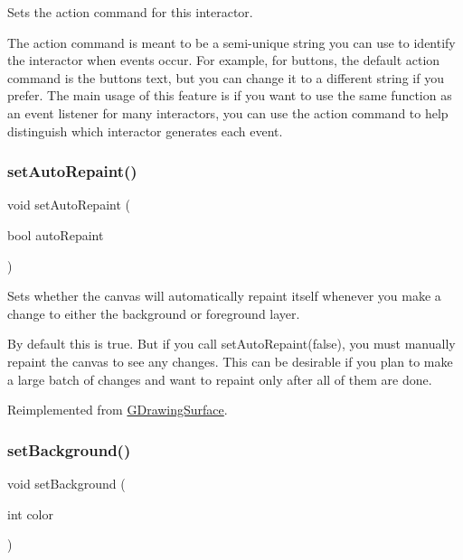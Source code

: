Sets the action command for this interactor. 

The action command is meant to be a semi-\/unique string you can use to identify the interactor when events occur. For example, for buttons, the default action command is the button\textquotesingle{}s text, but you can change it to a different string if you prefer. The main usage of this feature is if you want to use the same function as an event listener for many interactors, you can use the action command to help distinguish which interactor generates each event. \mbox{\label{classGCanvas_ade731c276cd0bcd37639280d06571333}} 
\subsubsection{\texorpdfstring{set\+Auto\+Repaint()}{setAutoRepaint()}}
{\footnotesize\ttfamily void set\+Auto\+Repaint (\begin{DoxyParamCaption}\item[{bool}]{auto\+Repaint }\end{DoxyParamCaption})\hspace{0.3cm}{\ttfamily [virtual]}}



Sets whether the canvas will automatically repaint itself whenever you make a change to either the background or foreground layer. 

By default this is true. But if you call set\+Auto\+Repaint(false), you must manually repaint the canvas to see any changes. This can be desirable if you plan to make a large batch of changes and want to repaint only after all of them are done. 

Reimplemented from \mbox{\hyperlink{classGDrawingSurface_adf10848319457bd6df4c657bf8872bee}{G\+Drawing\+Surface}}.

\mbox{\label{classGCanvas_a427fefbbc34e39e5df27a807da488e0d}} 
\subsubsection{\texorpdfstring{set\+Background()}{setBackground()}\hspace{0.1cm}{\footnotesize\ttfamily [1/2]}}
{\footnotesize\ttfamily void set\+Background (\begin{DoxyParamCaption}\item[{int}]{color }\end{DoxyParamCaption})\hspace{0.3cm}{\ttfamily [virtual]}}



